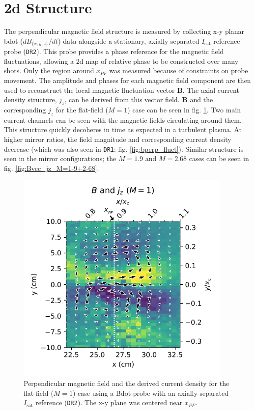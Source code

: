 \section{\label{sec:structure}2d Structure}
The perpendicular magnetic field structure is measured by collecting x-y planar bdot ($d B_{\{x, y, z \} } / dt$) data alongside a stationary, axially separated $I_\text{sat}$ reference probe (\texttt{DR2}). This probe provides a phase reference for the magnetic field fluctuations, allowing a 2d map of relative phase to be constructed over many shots. Only the region around $x_{PF}$ was measured because of constraints on probe movement. The amplitude and phases for each magnetic field component are then used to reconstruct the local magnetic fluctuation vector $\boldsymbol{B}$. The axial current density structure, $j_z$, can be derived from this vector field. $\boldsymbol{B}$ and the corresponding $j_z$ for the flat-field ($M=1$) case can be seen in fig. \ref{fig:Bvec_jz_M=1}.
Two main current channels can be seen with the magnetic fields circulating around them. This structure quickly decoheres in time as expected in a turbulent plasma. At higher mirror ratios, the field magnitude and corresponding current density decrease (which was also seen in \texttt{DR1}: fig. \ref{fig:bperp_fluct}). Similar structure is seen in the mirror configurations; the $M=1.9$ and $M=2.68$ cases can be seen in fig. \ref{fig:Bvec_jz_M=1-9+2-68}. 
\begin{figure}
    \centering
    \includegraphics[width=300pt]{figures/fig16.pdf}
    \caption{Perpendicular magnetic field and the derived current density for the flat-field ($M=1$) case using a Bdot probe with an axially-separated $I_\text{sat}$ reference (\texttt{DR2}). The x-y plane was centered near $x_{PF}$.}
    \label{fig:Bvec_jz_M=1}
\end{figure}

